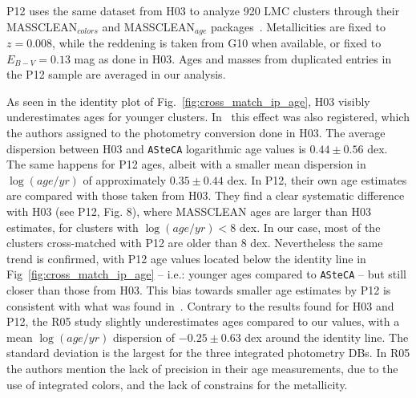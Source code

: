 \documentclass{aa}
\begin{document}
P12 uses the same dataset from H03 to analyze 920 LMC clusters through their
MASSCLEAN$_{colors}$ and MASSCLEAN$_{age}$
packages~\citep{Popescu_2010a,Popescu_2010b}. Metallicities are fixed to
$z{=0}.008$, while the reddening is taken from G10 when available, or fixed to
$E_{B-V}{=}0.13$ mag as done in H03. Ages and masses from duplicated entries in
the P12 sample are averaged in our analysis.


As seen in the identity plot of Fig.~\ref{fig:cross_match_ip_age}, H03
visibly underestimates ages for younger clusters.
In~\citet[][see Fig. 1]{de_Grijs_2006} this effect was also registered, which
the authors assigned to the photometry conversion done in H03. The average
dispersion between H03 and \texttt{ASteCA} logarithmic age values is
$0.44{\pm}0.56$ dex.
%
The same happens for P12 ages, albeit with a smaller mean dispersion in
$\log(age/yr)$ of approximately $0.35{\pm}0.44$ dex.
In P12, their own age estimates are compared with those taken from H03.
They find a clear systematic difference with H03 (see P12, Fig. 8),
where MASSCLEAN ages are larger than H03 estimates, for clusters with
$\log(age/yr){<}8$ dex. In our case, most of the clusters cross-matched with P12 are
older than 8 dex. Nevertheless the same trend is confirmed, with P12 age values
located below the identity line in Fig~\ref{fig:cross_match_ip_age} -- i.e.:
younger ages compared to \texttt{ASteCA} -- but still closer than those from
H03. This bias towards smaller age estimates by P12 is consistent with what was
found in~\cite{Choudhury_2015}.
%
Contrary to the results found for H03 and P12, the R05 study slightly
underestimates ages compared to our values, with a mean $\log(age/yr)$
dispersion of $-0.25{\pm}0.63$ dex around the identity line. The standard
deviation is the largest for the three integrated photometry DBs. In R05 the
authors mention the lack of precision in their age measurements, due to the use
of integrated colors, and the lack of constrains for the metallicity.
\end{document}
